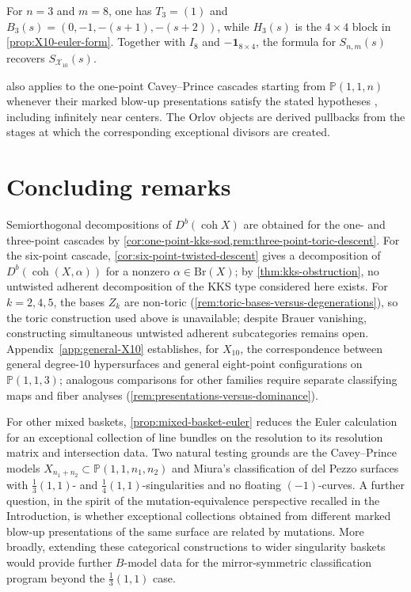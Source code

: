 \documentclass[11pt]{article}
\theoremstyle{plain}
\theoremstyle{definition}
\theoremstyle{remark}
\newcommand{\Pp}{\mathbb P}
\newcommand{\Db}{D^b}
\newcommand{\coh}{\operatorname{coh}}
\newcommand{\Br}{\mathrm{Br}}
\begin{document}
For \(n=3\) and \(m=8\), one has \(T_3=(1)\) and
\(B_3(s)=(0,-1,-(s+1),-(s+2))\), while \(H_3(s)\) is the
\(4\times4\) block in \cref{prop:X10-euler-form}. Together with \(I_8\) and
\(-\mathbf1_{8\times4}\), the formula for \(S_{n,m}(s)\) recovers
\(S_{\mathcal X_{10}}(s)\).

 also applies to the one-point
Cavey--Prince cascades starting from \(\Pp(1,1,n)\) whenever their
marked blow-up presentations satisfy the stated hypotheses
\cite{CAVEY2020}, including infinitely near centers. The Orlov objects
are derived pullbacks from the stages at which the corresponding exceptional
divisors are created.


\section*{Concluding remarks}

Semiorthogonal decompositions of \(\Db(\coh X)\) are obtained for the one-
and three-point cascades by
\cref{cor:one-point-kks-sod,rem:three-point-toric-descent}.
For the six-point cascade, \cref{cor:six-point-twisted-descent}
gives a decomposition of \(\Db(\coh(X,\alpha))\) for a nonzero
\(\alpha\in\Br(X)\); by \cref{thm:kks-obstruction}, no untwisted
adherent decomposition of the KKS type considered here exists.
For \(k=2,4,5\), the bases \(Z_k\) are non-toric
(\cref{rem:toric-bases-versus-degenerations}), so the toric construction
used above is unavailable; despite Brauer vanishing, constructing
simultaneous untwisted adherent subcategories remains open.
Appendix~\ref{app:general-X10} establishes, for \(X_{10}\), the
correspondence between general degree-\(10\) hypersurfaces and general
eight-point configurations on \(\Pp(1,1,3)\); analogous comparisons for
other families require separate classifying maps and fiber analyses
(\cref{rem:presentations-versus-dominance}).

For other mixed baskets, \cref{prop:mixed-basket-euler} reduces the
Euler calculation for an exceptional collection of line bundles on the resolution to its
resolution matrix and intersection data. Two natural testing grounds are
the Cavey--Prince models
\(X_{n_1+n_2}\subset\Pp(1,1,n_1,n_2)\)
\cite[Corollary~7.1]{CAVEY2020} and Miura's classification
\cite{Miura2019} of del Pezzo surfaces with \(\tfrac13(1,1)\)- and
\(\tfrac14(1,1)\)-singularities and no floating \((-1)\)-curves.
A further question, in the spirit of the mutation-equivalence perspective
recalled in the Introduction, is whether exceptional collections obtained
from different marked blow-up presentations of the same surface are
related by mutations. More broadly, extending these categorical
constructions to wider singularity baskets would provide further
\(B\)-model data for the mirror-symmetric classification program beyond
the \(\tfrac13(1,1)\) case.
\end{document}
